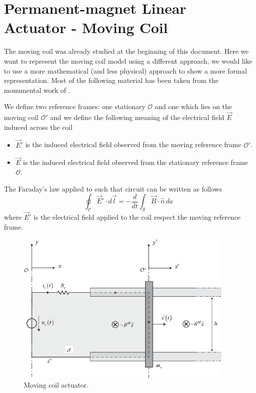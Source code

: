 \documentclass[11pt,a4paper,oneside]{book}
\numberwithin{equation}{section}
\theoremstyle{it}
\theoremstyle{definition}
\begin{document}
\section{Permanent-magnet Linear Actuator - Moving 
Coil}\label{moving_coil_jackson_section}
The moving coil was already studied at the beginning of this document. Here we 
want to represent the moving coil model using a different approach, we would 
like to use a more mathematical (and less physical) approach to show a more 
formal representation. Most of the following material has been taken from the 
monumental work of \cite{furlani}.

We define two reference frames: one stationary $\mathcal{O}$ and one which lies 
on the moving coil $\mathcal{O'}$ and we define the following meaning of the 
electrical field $\vec{E}$ induced across the coil
\begin{itemize}
	\item $\vec{E}'$ is the induced electrical field observed from the moving 
	reference frame $\mathcal{O'}$.
	\item $\vec{E}$ is the induced electrical field observed from the 
	stationary reference frame $\mathcal{O}$.	
\end{itemize}  
The Faraday's law applied to such that circuit can be written as follows
\begin{equation}\label{jackson_1}
	\oint_\mathcal{C}\vec{E}'\cdot d\vec{l} = -\frac{d}{dt}\int_\mathcal 
	{S}\vec{B}\cdot\hat{n}\,da
\end{equation}
where $\vec{E}'$ is the electrical field applied to the coil respect the moving 
reference frame. 
\begin{figure}[H]
	\centering
	\includegraphics[width = 300pt, angle = 0, 
	keepaspectratio]{figures/appendix/moving_coil_3.eps}
	\captionsetup{width=0.75\textwidth}		
	\caption{Moving coil actuator.}
	\label{moving_coil_3a}
\end{figure}
\end{document}
